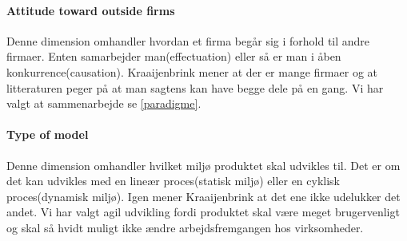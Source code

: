 \paragraph{Attitude toward outside firms}
Denne dimension omhandler hvordan et firma begår sig i forhold til andre firmaer.
Enten samarbejder man(effectuation) eller så er man i åben konkurrence(causation).
Kraaijenbrink mener at der er mange firmaer og at litteraturen peger på at man sagtens kan have begge dele på en gang.
Vi har valgt at sammenarbejde se \cref{paradigme}.

\paragraph{Type of model}
Denne dimension omhandler hvilket miljø produktet skal udvikles til.
Det er om det kan udvikles med en lineær proces(statisk miljø) eller en cyklisk proces(dynamisk miljø).
Igen mener Kraaijenbrink at det ene ikke udelukker det andet.
Vi har valgt agil udvikling fordi produktet skal være meget brugervenligt og skal så hvidt muligt ikke ændre arbejdsfremgangen hos virksomheder.
